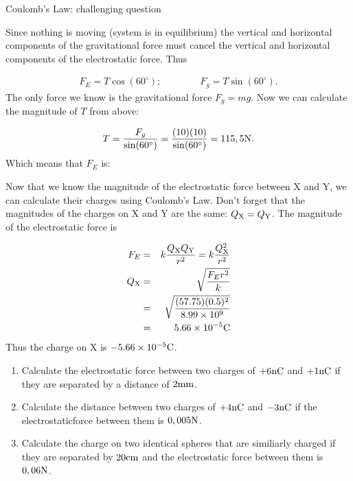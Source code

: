 \begin{wex}{Coulomb's Law: challenging question}
{
Since nothing is moving (system is in equilibrium) the vertical
and horizontal components of the gravitational force must cancel the vertical and horizontal components of the electrostatic force. Thus

\begin{eqnarray*}
F_E=T\cos(60^{\circ});\qquad\qquad F_g=T\sin(60^{\circ}).
\end{eqnarray*}
The only force we know is the gravitational force $F_g=mg$. Now we
can calculate the magnitude of $T$ from above:

\begin{eqnarray*}
T=\frac{F_g}{\sin(60^{\circ})}=\frac{(10)(10)}{\sin(60^ {\circ})}=115,5{\rm N}.
\end{eqnarray*}
Which means that $F_E$ is:


\westep{} Now that we know the magnitude of the electrostatic
force between X and Y, we can calculate their charges using
Coulomb's Law. Don't forget that the magnitudes of the charges on
X and Y are the same: $Q_{\rm X}=Q_{\rm Y}$. The magnitude of
the electrostatic force is

\begin{eqnarray*}
F_E &=& k\frac{Q_{\rm X}Q_{\rm Y}}{r^2}= k\frac{Q_{\rm X}^2}{r^2}\\
Q_{\rm X}&=&\sqrt{\frac{F_E r^2}{k}}\\
&=&\sqrt{\frac{(57.75)(0.5)^2}{8.99\times10^{9}}}\\
&=&5.66\times10^{-5}{\rm C}
\end{eqnarray*}
Thus the charge on X is $-5.66\times10^{-5}{\rm C}$.}
\end{wex}

{
\begin{enumerate}
\item Calculate the electrostatic force between two charges of $+6{\rm nC}$ and $+1{\rm nC}$ if they are separated by a distance of $2 {\rm mm}$.
\item Calculate the distance between two charges of $+4{\rm nC}$ and $-3{\rm nC}$ if the electrostaticforce between them is $0,005 {\rm N}$.
\item Calculate the charge on two identical spheres that are similiarly charged if they are separated by $20 {\rm cm}$ and the electrostatic force between them is $0,06 {\rm N}$.
\end{enumerate}
}

